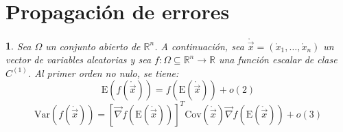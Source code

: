\documentclass[11pt,a4paper,spanish]{article}
\numberwithin{equation}{section}
\numberwithin{table}{section}
\numberwithin{figure}{section}
\theoremstyle{definition}
\theoremstyle{remark}
\theoremstyle{definition}
\theoremstyle{remark}
\theoremstyle{plain}
\theoremstyle{plain}
\theoremstyle{plain}
\theoremstyle{plain}
\newtheorem{thm}{\protect\theoremname}[section]
\theoremstyle{plain}
\theoremstyle{plain}
\providecommand{\theoremname}{Teorema}
\begin{document}
	\section{Propagación de errores}\label{subsec:propagacion errores}
	\begin{thm}
		\label{thm:propagaci=0000F3n de errores}Sea $\Omega$ un conjunto
		abierto de $\mathbb{R}^{n}$. A continuación, sea $\mathring{\vec{x}}=\left(\mathring{x}_{1},\dots,\mathring{x}_{n}\right)$
		un vector de variables aleatorias y sea $f:\Omega\subseteq\mathbb{R}^{n}\longrightarrow\mathbb{R}$
		una función escalar de clase $C^{\left(1\right)}$. Al primer orden
		no nulo, se tiene:
		\[
		\mathrm{E}\left(f\left(\mathring{\vec{x}}\right)\right)=f\left(\mathrm{E}\left(\mathring{\vec{x}}\right)\right)+o\left(2\right)
		\]
		\[
		\mathrm{Var}\left(f\left(\mathring{\vec{x}}\right)\right)=\left[\vec{\nabla}f\left(\mathrm{E}\left(\mathring{\vec{x}}\right)\right)\right]^{T}\mathrm{Cov}\left(\mathring{\vec{x}}\right)\vec{\nabla}f\left(\mathrm{E}\left(\mathring{\vec{x}}\right)\right)+o\left(3\right)
		\]
	\end{thm}
\end{document}
